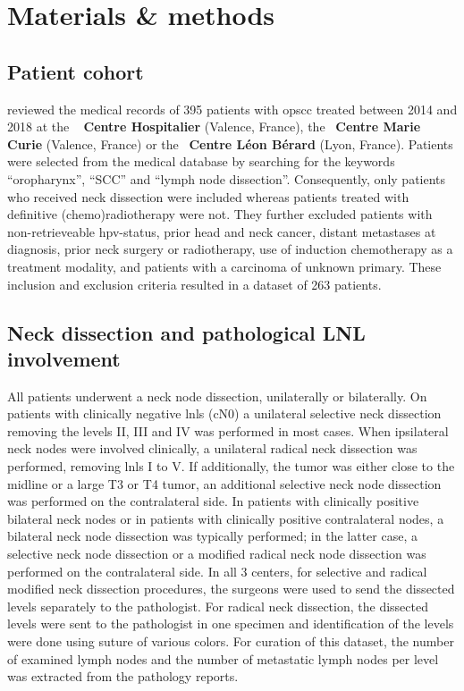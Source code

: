 \documentclass[\relativeRoot/main.tex]{subfiles}
\begin{document}
\section{Materials \& methods}
\label{sec:dataset_clb:methods}

\subsection*{Patient cohort}
\label{subsec:dataset_clb:methods:cohort}

 reviewed the medical records of 395 patients with \gls{opscc} treated between 2014 and 2018 at the ~\textbf{
Centre Hospitalier} (Valence, France), the ~\textbf{Centre Marie Curie} (Valence, France) or the ~\textbf{Centre Léon Bérard} (Lyon, France). Patients were selected from the medical database by searching for the keywords ``oropharynx'', ``SCC'' and ``lymph node dissection''. Consequently, only patients who received neck dissection were included whereas patients treated with definitive (chemo)radiotherapy were not. They further excluded patients with non-retrieveable \gls{hpv}-status, prior head and neck cancer, distant metastases at diagnosis, prior neck surgery or radiotherapy, use of induction chemotherapy as a treatment modality, and patients with a carcinoma of unknown primary. These inclusion and exclusion criteria resulted in a dataset of 263 patients.

\subsection*{Neck dissection and pathological LNL involvement}
\label{subsec:dataset_clb:methods:dissection}

All patients underwent a neck node dissection, unilaterally or bilaterally. On patients with clinically negative \glspl{lnl} (cN0) a unilateral selective neck dissection removing the levels II, III and IV was performed in most cases. When ipsilateral neck nodes were involved clinically, a unilateral radical neck dissection was performed, removing \glspl{lnl} I to V. If additionally, the tumor was either close to the midline or a large T3 or T4 tumor, an additional selective neck node dissection was performed on the contralateral side. In patients with clinically positive bilateral neck nodes or in patients with clinically positive contralateral nodes, a bilateral neck node dissection was typically performed; in the latter case, a selective neck node dissection or a modified radical neck node dissection was performed on the contralateral side. In all 3 centers, for selective and radical modified neck dissection procedures, the surgeons were used to send the dissected levels separately to the pathologist. For radical neck dissection, the dissected levels were sent to the pathologist in one specimen and identification of the levels were done using suture of various colors. For curation of this dataset, the number of examined lymph nodes and the number of metastatic lymph nodes per level was extracted from the pathology reports.
\end{document}
